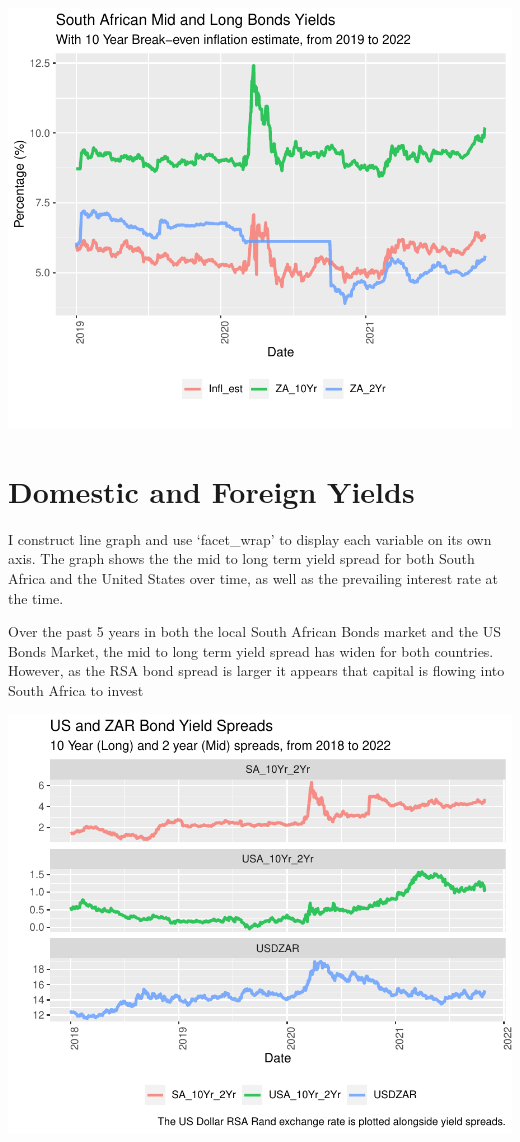 \documentclass[11pt,preprint, authoryear]{elsarticle}
\numberwithin{equation}{section}
\numberwithin{figure}{section}
\numberwithin{table}{section}
\begin{document}
\includegraphics{Question2_files/figure-latex/unnamed-chunk-3-1.pdf}

\hypertarget{domestic-and-foreign-yields}{%
\section{Domestic and Foreign
Yields}\label{domestic-and-foreign-yields}}

I construct line graph and use `facet\_wrap' to display each variable on
its own axis. The graph shows the the mid to long term yield spread for
both South Africa and the United States over time, as well as the
prevailing interest rate at the time.

Over the past 5 years in both the local South African Bonds market and
the US Bonds Market, the mid to long term yield spread has widen for
both countries. However, as the RSA bond spread is larger it appears
that capital is flowing into South Africa to invest

\includegraphics{Question2_files/figure-latex/unnamed-chunk-4-1.pdf}
\end{document}

